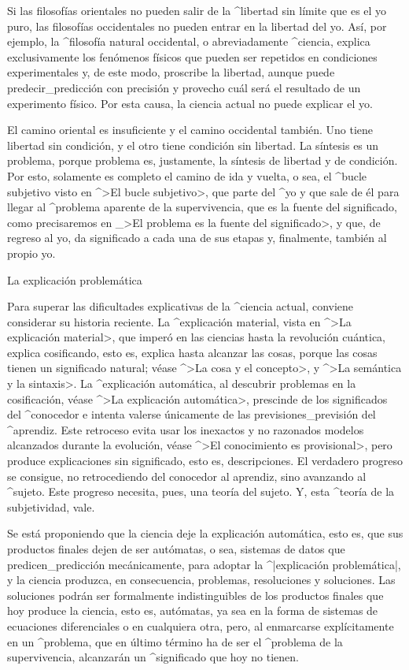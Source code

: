 Si las filosofías orientales no pueden salir de la ^{libertad} sin
límite que es el yo puro, las filosofías occidentales no pueden entrar
en la libertad del yo. Así, por ejemplo, la ^{filosofía} natural
occidental, o abreviadamente ^{ciencia}, explica exclusivamente los
fenómenos físicos que pueden ser repetidos en condiciones experimentales
y, de este modo, proscribe la libertad, aunque puede
predecir_{predicción} con precisión y provecho cuál será el resultado de
un experimento físico. Por esta causa, la ciencia actual no puede
explicar el yo.

El camino oriental es insuficiente y el camino occidental también. Uno
tiene libertad sin condición, y el otro tiene condición sin libertad. La
síntesis es un problema, porque problema es, justamente, la síntesis de
libertad y de condición. Por esto, solamente es completo el camino de
ida y vuelta, o sea, el ^{bucle subjetivo} visto en ^>El bucle
subjetivo>, que parte del ^{yo} y que sale de él para llegar al
^{problema aparente} de la supervivencia, que es la fuente del
significado, como precisaremos en _>El problema es la fuente del
significado>, y que, de regreso al yo, da significado a cada una de sus
etapas y, finalmente, también al propio yo.


\Section La explicación problemática

Para superar las dificultades explicativas de la ^{ciencia} actual,
conviene considerar su historia reciente. La ^{explicación material},
vista en ^>La explicación material>, que imperó en las ciencias hasta la
revolución cuántica, explica cosificando, esto es, explica hasta
alcanzar las cosas, porque las cosas tienen un significado natural;
véase ^>La cosa y el concepto>, y ^>La semántica y la sintaxis>. La
^{explicación automática}, al descubrir problemas en la cosificación,
véase ^>La explicación automática>, prescinde de los significados del
^{conocedor} e intenta valerse únicamente de las previsiones_{previsión}
del ^{aprendiz}. Este retroceso evita usar los inexactos y no razonados
modelos alcanzados durante la evolución, véase ^>El conocimiento es
provisional>, pero produce explicaciones sin significado, esto es,
descripciones. El verdadero progreso se consigue, no retrocediendo del
conocedor al aprendiz, sino avanzando al ^{sujeto}. Este progreso
necesita, pues, una teoría del sujeto. Y, esta ^{teoría de la
subjetividad}, vale.

Se está proponiendo que la ciencia deje la explicación automática, esto
es, que sus productos finales dejen de ser autómatas, o sea, sistemas de
datos que predicen_{predicción} mecánicamente, para adoptar la
^|explicación problemática|, y la ciencia produzca, en consecuencia,
problemas, resoluciones y soluciones. Las soluciones podrán ser
formalmente indistinguibles de los productos finales que hoy produce la
ciencia, esto es, autómatas, ya sea en la forma de sistemas de
ecuaciones diferenciales o en cualquiera otra, pero, al enmarcarse
explícitamente en un ^{problema}, que en último término ha de ser el
^{problema de la supervivencia}, alcanzarán un ^{significado} que hoy no
tienen.


